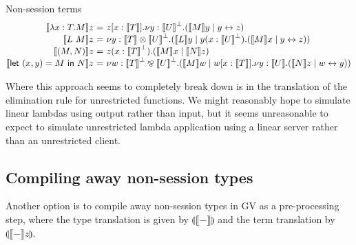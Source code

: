 \documentclass{easychair}
\makeatletter
\newcommand{\ba}{\begin{array}}
\newcommand{\ea}{\end{array}}
\newenvironment{equations}{\[\ba{@{}r@{~}c@{~}l@{}}}{\ea\]}
\newcommand{\key}{\mathsf}
\newcommand{\gvtocp}[1]{\llbracket{#1}\rrbracket}
\newcommand{\cptogv}[1]{\llparenthesis{#1}\rrparenthesis}
\newcommand{\gvPair}[2]{({#1},{#2})}
\newcommand{\gvLet}[3]{\key{let}~{#1}={#2}~\key{in}~{#3}}
\newcommand{\cpLink}[2]{{#1} \leftrightarrow {#2}}
\newcommand{\cpCut}[3]{\nu {#1}.({#2} \mid {#3})}
\newcommand{\cpInput}[3]{{#1}({#2}).{#3}}
\newcommand{\cpTimes}[2]{{#1} \otimes {#2}}
\newcommand{\cpPar}[2]{{#1} \mathbin{\bindnasrepma} {#2}}
\newcommand{\cpDual}[1]{{#1}^\bot}
\newcommand{\gvtocpd}[1]{\gvtocp{#1}}
\newcommand{\cpMix}[2]{({#1} \mid {#2})}
\newcommand{\cpCutOutput}[5]{{#2}[{#3}].\nu{#1}.\cpMix{#4}{#5}}
\makeatother
\begin{document}







Non-session terms
\begin{equations}
\gvtocpd{\lambda x:T.M}z &=&
  \cpCutOutput{y:{\cpDual{\gvtocpd{U}}}}{z}{x:{\gvtocpd{T}}}
              {\gvtocpd{M}y}{\cpLink{y}{z}} \\
\gvtocpd{L~M}z &=&
  \cpCut{y:\cpTimes{\gvtocpd{T}}{\cpDual{\gvtocpd{U}}}}
        {\gvtocpd{L}y}
        {\cpInput{y}{x:\cpDual{\gvtocpd{U}}}{\cpMix{\gvtocpd{M}x}{\cpLink{y}{z}}}} \\
\gvtocpd{\gvPair{M}{N}}z &=&
  \cpInput{z}{x:\cpDual{\gvtocpd{T}}}{\cpMix{\gvtocpd{M}x}{\gvtocpd{N}z}} \\
\gvtocpd{\gvLet{\gvPair{x}{y}}{M}{N}}z &=&
  \cpCut{w:\cpPar{\cpDual{\gvtocpd{T}}}{\cpDual{\gvtocpd{U}}}}
    {\gvtocpd{M}w}
    {\cpCutOutput{y:\gvtocpd{U}}{w}{x:\gvtocpd{T}}{\gvtocpd{N}z}{\cpLink{w}{y}}} \\
\end{equations}

Where this approach seems to completely break down is in the
translation of the elimination rule for unrestricted functions. We
might reasonably hope to simulate linear lambdas using output rather
than input, but it seems unreasonable to expect to simulate
unrestricted lambda application using a linear server rather than an
unrestricted client.

\subsection{Compiling away non-session types}

Another option is to compile away non-session types in GV as a
pre-processing step, where the type translation is given by
$\cptogv{\gvtocp{-}}$ and the term translation by
$\cptogv{\gvtocp{-}z}$.
\end{document}
